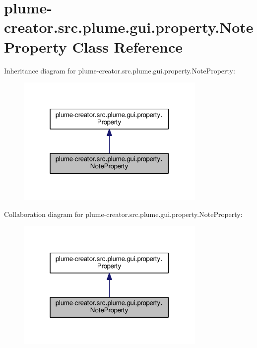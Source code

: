 \hypertarget{classplume-creator_1_1src_1_1plume_1_1gui_1_1property_1_1_note_property}{}\section{plume-\/creator.src.\+plume.\+gui.\+property.\+Note\+Property Class Reference}
\label{classplume-creator_1_1src_1_1plume_1_1gui_1_1property_1_1_note_property}


Inheritance diagram for plume-\/creator.src.\+plume.\+gui.\+property.\+Note\+Property\+:\nopagebreak
\begin{figure}[H]
\begin{center}
\leavevmode
\includegraphics[width=259pt]{classplume-creator_1_1src_1_1plume_1_1gui_1_1property_1_1_note_property__inherit__graph}
\end{center}
\end{figure}


Collaboration diagram for plume-\/creator.src.\+plume.\+gui.\+property.\+Note\+Property\+:\nopagebreak
\begin{figure}[H]
\begin{center}
\leavevmode
\includegraphics[width=259pt]{classplume-creator_1_1src_1_1plume_1_1gui_1_1property_1_1_note_property__coll__graph}
\end{center}
\end{figure}
